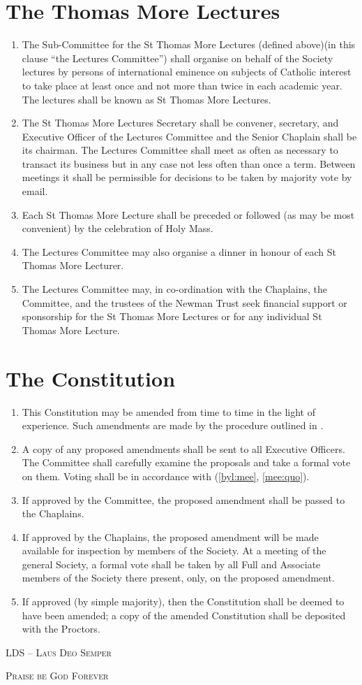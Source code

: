\documentclass[11pt]{article}
\begin{document}
\section{The Thomas More Lectures}
\begin{enumerate}
\item The Sub-Committee for the St Thomas More Lectures (defined above)(in this clause ``the Lectures Committee'') shall organise on behalf of the Society lectures by persons of international eminence on subjects of Catholic interest to take place at least once and not more than twice in each academic year. The lectures shall be known as St Thomas More Lectures.
\item The St Thomas More Lectures Secretary shall be convener, secretary, and Executive Officer of the Lectures Committee and the Senior Chaplain shall be its chairman. The Lectures Committee shall meet as often as necessary to transact its business but in any case not less often than once a term. Between meetings it shall be permissible for decisions to be taken by majority vote by email.
\item Each St Thomas More Lecture shall be preceded or followed (as may be most convenient) by the celebration of Holy Mass. 
\item The Lectures Committee may also organise a dinner in honour of each St Thomas More Lecturer.
\item The Lectures Committee may, in co-ordination with the Chaplains, the Committee, and the trustees of the Newman Trust seek financial support or sponsorship for the St Thomas More Lectures or for any individual St Thomas More Lecture.
\end{enumerate}
\section{The Constitution}
\begin{enumerate}
\item This Constitution may be amended from time to time in the light of experience. Such amendments are made by the procedure outlined in .
\item \label{con:cha} A copy of any proposed amendments shall be sent to all Executive Officers. The Committee shall carefully examine the proposals and take a formal vote on them. Voting shall be in accordance with  (\cref{byl:mee}, \cref{mee:quo}).
\item If approved by the Committee, the proposed amendment shall be passed to the Chaplains.
\item If approved by the Chaplains, the proposed amendment will be made available for inspection by members of the Society. At a meeting of the general Society, a formal vote shall be taken by all Full and Associate members of the Society there present, only, on the proposed amendment.
\item \label{con:app} If approved (by simple majority), then the Constitution shall be deemed to have been amended; a copy of the amended Constitution shall be deposited with the Proctors.
\end{enumerate}

\centerline{\scshape{LDS -- Laus Deo Semper}}

\centerline{\scshape{Praise be God Forever}}
\end{document}
